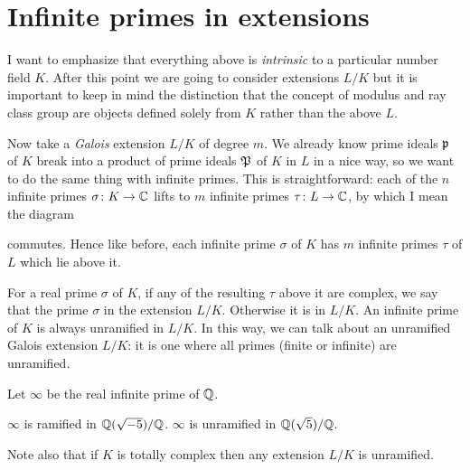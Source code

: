 \section{Infinite primes in extensions}
I want to emphasize that everything above is
\emph{intrinsic} to a particular number field $K$.
After this point we are going to consider extensions $L/K$
but it is important to keep in mind the distinction that
the concept of modulus and ray class group are objects
defined solely from $K$ rather than the above $L$.

Now take a \emph{Galois} extension $L/K$ of degree $m$.
We already know prime ideals $\mathfrak p$ of $K$ break into
a product of prime ideals $\mathfrak P$ of $K$ in $L$ in a nice way,
so we want to do the same thing with infinite primes.
This is straightforward: each of the $n$ infinite primes
$\sigma \colon K \to \mathbb C$ lifts to $m$ infinite primes $\tau \colon L \to \mathbb C$,
by which I mean the diagram
\begin{center}
\end{center}
commutes.
Hence like before, each infinite prime $\sigma$ of $K$
has $m$ infinite primes $\tau$ of $L$ which lie above it.

For a real prime $\sigma$ of $K$, if any of the resulting $\tau$ above it
are complex, we say that the prime $\sigma$ 
in the extension $L/K$. Otherwise it is  in $L/K$.
An infinite prime of $K$ is always unramified in $L/K$.
In this way, we can talk about an unramified Galois extension $L/K$:
it is one where all primes (finite or infinite) are unramified.

\begin{example}
	Let $\infty$ be the real infinite prime of $\mathbb Q$.
	\begin{itemize}
		\ii $\infty$ is ramified in $\mathbb Q(\sqrt{-5})/\mathbb Q$.
		\ii $\infty$ is unramified in $\mathbb Q(\sqrt{5})/\mathbb Q$.
	\end{itemize}
	Note also that if $K$ is totally complex
	then any extension $L/K$ is unramified.
\end{example}

